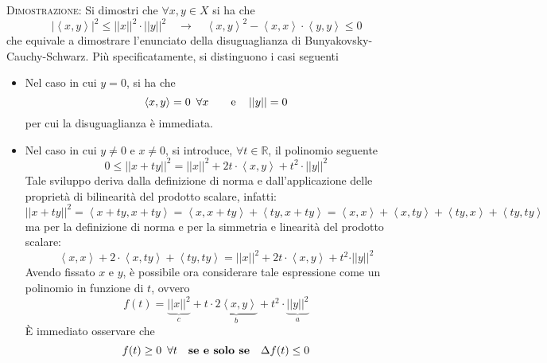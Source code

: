 \documentclass[a4paper]{extarticle}
\begin{document}
\vspace{2em}
\noindent
\normalfont \normalsize
\textsc{Dimostrazione}: Si dimostri che $\forall x, y \in X$ si ha che
\[\left \vert \left<x,y\right> \right \vert^2 \leq \left \vert \left \vert x \right \vert \right \vert^2 \cdot \left \vert \left \vert y \right \vert \right \vert^2 \hspace{1em} \rightarrow \hspace{1em} \left<x,y\right>^2 - \left<x,x\right> \cdot \left<y,y\right> \leq 0\]
che equivale a dimostrare l'enunciato della disuguaglianza di Bunyakovsky-Cauchy-Schwarz. Più specificatamente, si distinguono i casi seguenti
\begin{itemize}
    \item Nel caso in cui $y=0$, si ha che
    \[\left<x,y\right>=0 \hspace{0.5em} \forall x \hspace{1em} \hspace{1em} \text{e} \hspace{1em} \left \vert \left \vert y \right \vert \right \vert = 0\]
    per cui la disuguaglianza è immediata.
    \item Nel caso in cui $y \neq 0$ e $x \neq 0$, si introduce, $\forall t \in \mathbb{R}$, il polinomio seguente
    \[0 \leq \left \vert \left \vert x + ty \right \vert \right \vert^2 = \left \vert \left \vert x \right \vert \right \vert^2 + 2t \cdot \left<x,y\right> + t^2 \cdot \left \vert \left \vert y \right \vert \right \vert^2\]
    Tale sviluppo deriva dalla definizione di norma e dall'applicazione delle proprietà di bilinearità del prodotto scalare, infatti:
    \[\vert \vert x+ty \vert \vert^2 = \left<x+ty,x+ty\right>=\left<x,x+ty\right>+\left<ty,x+ty\right>=\left<x,x\right>+\left<x,ty\right>+\left<ty,x\right>+\left<ty,ty\right>\]
    ma per la definizione di norma e per la simmetria e linearità del prodotto scalare:
    \[\left<x,x\right>+2 \cdot \left<x,ty\right>+\left<ty,ty\right> = \vert \vert x \vert \vert^2 + 2t \cdot \left<x,y\right> + t^2 \cdot \vert \vert y \vert \vert^2\]
    Avendo fissato $x$ e $y$, è possibile ora considerare tale espressione come un polinomio in funzione di $t$, ovvero
    \[f(t) = \underbrace{\vert \vert x \vert \vert^2}_c + t \cdot \underbrace{2\left<x,y\right>}_b + t^2 \cdot \underbrace{\vert \vert y \vert \vert^2}_a\]
    È immediato osservare che
    \[f(t) \geq 0 \hspace{0.5em} \forall t \hspace{1em} \textbf{se e solo se} \hspace{1em} \Delta f(t) \leq 0\]

\end{itemize}
\end{document}
